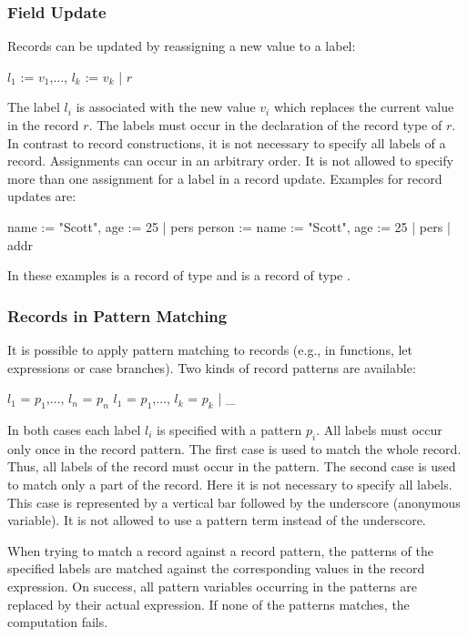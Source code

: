 \subsubsection{Field Update}
\label{sec-fieldupd}

Records can be updated by reassigning a new value to a label:
\begin{curry}
{$l_1$ := $v_1$,$\ldots$, $l_k$ := $v_k$ | $r$}
\end{curry}
The label $l_i$ is associated with the new value $v_i$ which
replaces the current value in the record $r$.
The labels must occur in the declaration
of the record type of $r$. In contrast to record constructions,
it is not necessary to specify all labels of a record.
Assignments can occur in an arbitrary order. It is not allowed to
specify more than one assignment for a label in a record update.
Examples for record updates are:
\begin{curry}
{name := "Scott", age := 25 | pers}
{person := {name := "Scott", age := 25 | pers} | addr}
\end{curry}
In these examples  is a record of type  and 
is a record of type .


\subsubsection{Records in Pattern Matching}
\label{sec-recsinpm}

It is possible to apply pattern matching to records (e.g., in functions,
let expressions or case branches). Two kinds of record patterns
are available:
\begin{curry}
{$l_1$ = $p_1$,$\ldots$, $l_n$ = $p_n$}
{$l_1$ = $p_1$,$\ldots$, $l_k$ = $p_k$ | _}
\end{curry}
In both cases each label $l_i$ is specified with a pattern $p_i$.
All labels must occur only once in the record pattern.
The first case is used to match the whole record. Thus, all labels
of the record must occur in the pattern.
The second case is used to match only a part of
the record. Here it is not necessary to specify all labels.
This case is represented by a vertical bar followed by the underscore
(anonymous variable). It is
not allowed to use a pattern term instead of the underscore.


When trying to match a record against a record pattern, the
patterns of the specified labels are matched against
the corresponding values in the record expression. On success, all pattern
variables occurring in the patterns are replaced by their actual expression.
If none of the patterns matches, the computation fails.



